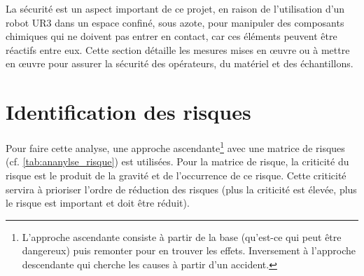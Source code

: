 La sécurité est un aspect important de ce projet, en raison de l'utilisation d'un robot UR$3$ dans un espace confiné, sous azote, pour manipuler des composants chimiques qui ne doivent pas entrer en contact, car ces éléments peuvent être réactifs entre eux. Cette section détaille les mesures mises en \oe{}uvre ou à mettre en \oe{}uvre pour assurer la sécurité des opérateurs, du matériel et des échantillons.
\section{Identification des risques}\label{sec:identification_risque}
Pour faire cette analyse, une approche ascendante\footnote{L'approche ascendante consiste à partir de la base (qu'est-ce qui peut être dangereux) puis remonter pour en trouver les effets. Inversement à l'approche descendante qui cherche les causes à partir d'un accident.} avec une matrice de risques (cf. \autoref{tab:ananylse_risque}) est utilisées. Pour la matrice de risque, la criticité du risque est le produit de la gravité et de l'occurrence de ce risque. Cette criticité servira à prioriser l'ordre de réduction des risques (plus la criticité est élevée, plus le risque est important et doit être réduit).

